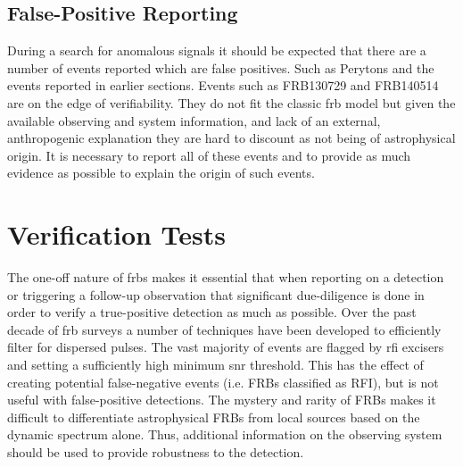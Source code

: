 \documentclass[a4paper,fleqn,usenatbib]{mnras}
\begin{document}
\subsection{False-Positive Reporting}

During a search for anomalous signals it should be expected that there are a
number of events reported which are false positives. Such as Perytons
\citep{2011ApJ...727...18B} and the events reported in earlier sections. Events
such as FRB130729 and FRB140514 are on the edge of verifiability. They do not
fit the classic \gls{frb} model but given the available observing and system
information, and lack of an external, anthropogenic explanation they are hard
to discount as not being of astrophysical origin. It is necessary to report
all of these events and to provide as much evidence as possible to explain the
origin of such events.

\section{Verification Tests}

The one-off nature of \glspl{frb} makes it essential that when reporting on a
detection or triggering a follow-up observation that significant due-diligence
is done in order to verify a true-positive detection as much as possible. Over the
past decade of \gls{frb} surveys a number of techniques have been developed to
efficiently filter for dispersed pulses. The vast majority of events are flagged
by \gls{rfi} excisers and setting a sufficiently high minimum \gls{snr}
threshold. This has the effect of creating potential false-negative events (i.e.
FRBs classified as RFI), but is not useful with false-positive detections. The
mystery and rarity of FRBs makes it difficult to differentiate astrophysical FRBs
from local sources based on the dynamic spectrum alone. Thus, additional
information on the observing system should be used to provide robustness to the
detection.

\end{document}
